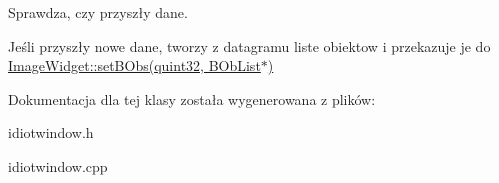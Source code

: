 Sprawdza, czy przyszły dane. 

Jeśli przyszły nowe dane, tworzy z datagramu liste obiektow i przekazuje je do \hyperlink{class_image_widget_aa86269777fd7075bc223a5c8e011252b}{ImageWidget::setBObs(quint32, BObList$\ast$)} 

Dokumentacja dla tej klasy została wygenerowana z plików:\begin{DoxyCompactItemize}
\item 
idiotwindow.h\item 
idiotwindow.cpp\end{DoxyCompactItemize}
